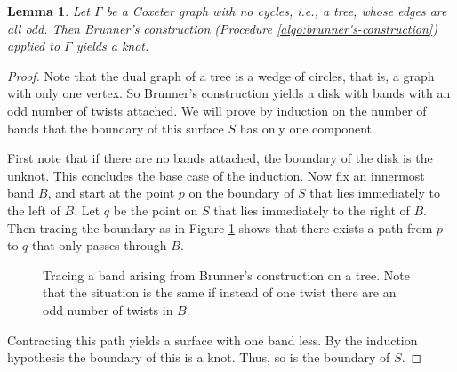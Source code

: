 \documentclass{article}
\newtheorem{lemma}[theorem]{Lemma}
\theoremstyle{definition}
\begin{document}
\begin{lemma}\label{lem:tree->knot}
Let $\Gamma$ be a Coxeter graph with no cycles, i.e., a tree, whose edges are all odd. Then Brunner's construction \textup{(Procedure \ref{algo:brunner's-construction})} applied to $\Gamma$ yields a knot.
\end{lemma}

\begin{proof}
Note that the dual graph of a tree is a wedge of circles, that is, a graph with only one vertex. So Brunner's construction yields a disk with bands with an odd number of twists attached. We will prove by induction on the number of bands that the boundary of this surface $S$ has only one component.

First note that if there are no bands attached, the boundary of the disk is the unknot. This concludes the base case of the induction. Now  fix an innermost band $B$, and start at the point $p$ on the boundary of $S$ that lies immediately to the left of $B$. Let $q$ be the point on $S$ that lies immediately to the right of $B$. Then tracing the boundary as in Figure \ref{fig:tracing-band} shows that there exists a path from $p$ to $q$ that only passes through $B$.

\begin{figure}[htb]
\centering
{}
\caption{Tracing a band arising from Brunner's construction on a tree. Note that the situation is the same if instead of one twist there are an odd number of twists in $B$.}
\label{fig:tracing-band}
\end{figure}

Contracting this path yields a surface with one band less. By the induction hypothesis the boundary of this is a knot. Thus, so is the boundary of $S$.
\end{proof}
\end{document}
